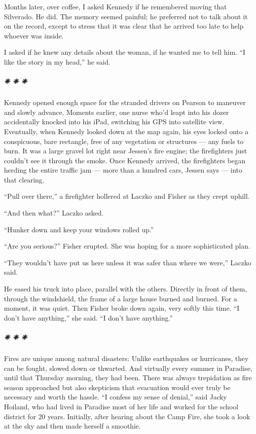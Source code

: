 Months later, over coffee, I asked Kennedy if he remembered moving that
Silverado. He did. The memory seemed painful; he preferred not to talk
about it on the record, except to stress that it was clear that he
arrived too late to help whoever was inside.

I asked if he knew any details about the woman, if he wanted me to tell
him. ``I like the story in my head,'' he said.

\hypertarget{---9}{%
\subparagraph{❈ ❈ ❈}\label{---9}}

Kennedy opened enough space for the stranded drivers on Pearson to
maneuver and slowly advance. Moments earlier, one nurse who'd leapt into
his dozer accidentally knocked into his iPad, switching his GPS into
satellite view. Eventually, when Kennedy looked down at the map again,
his eyes locked onto a conspicuous, bare rectangle, free of any
vegetation or structures --- any fuels to burn. It was a large gravel
lot right near Jessen's fire engine; the firefighters just couldn't see
it through the smoke. Once Kennedy arrived, the firefighters began
herding the entire traffic jam --- more than a hundred cars, Jessen says
--- into that clearing.

``Pull over there,'' a firefighter hollered at Laczko and Fisher as they
crept uphill.

``And then what?'' Laczko asked.

``Hunker down and keep your windows rolled up.''

``Are you serious?'' Fisher erupted. She was hoping for a more
sophisticated plan.

``They wouldn't have put us here unless it was safer than where we
were,'' Laczko said.

He eased his truck into place, parallel with the others. Directly in
front of them, through the windshield, the frame of a large house burned
and burned. For a moment, it was quiet. Then Fisher broke down again,
very softly this time. ``I don't have anything,'' she said. ``I don't
have anything.''

\hypertarget{---10}{%
\subparagraph{❈ ❈ ❈}\label{---10}}

Fires are unique among natural disasters: Unlike earthquakes or
hurricanes, they can be fought, slowed down or thwarted. And virtually
every summer in Paradise, until that Thursday morning, they had been.
There was always trepidation as fire season approached but also
skepticism that evacuation would ever truly be necessary and worth the
hassle. ``I confess my sense of denial,'' said Jacky Hoiland, who had
lived in Paradise most of her life and worked for the school district
for 20 years. Initially, after hearing about the Camp Fire, she took a
look at the sky and then made herself a smoothie.

